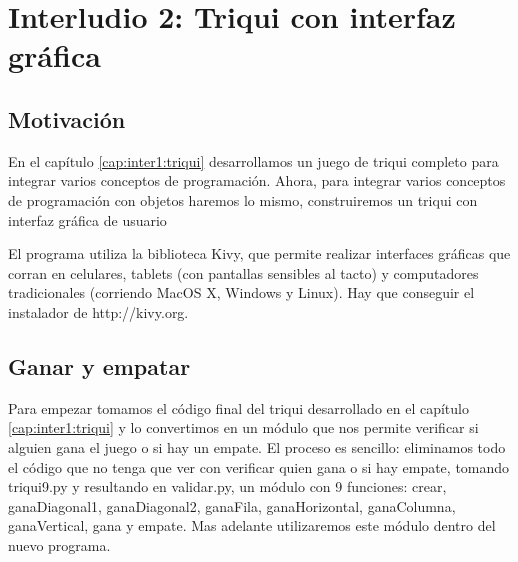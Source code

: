 


\chapter{Interludio 2: Triqui con interfaz gráfica}


\section{Motivación}
En el capítulo \ref{cap:inter1:triqui} desarrollamos un juego de triqui completo
para integrar varios conceptos de programación. Ahora, para integrar varios
conceptos de programación con objetos haremos lo mismo, construiremos un triqui
con interfaz gráfica de usuario

El programa utiliza la biblioteca Kivy, que permite realizar interfaces
gráficas que corran en celulares, tablets (con pantallas sensibles al tacto) 
y computadores tradicionales (corriendo MacOS X, Windows y Linux). Hay que 
conseguir el instalador de http://kivy.org.

\section{Ganar y empatar}
Para empezar tomamos el código final del triqui desarrollado en el capítulo \ref{cap:inter1:triqui}
y lo convertimos en un módulo que nos permite verificar si alguien gana el juego o
si hay un empate. El proceso es sencillo: eliminamos todo el código que no tenga que ver con 
verificar quien gana o si hay empate, tomando triqui9.py y resultando en validar.py, un 
módulo con 9 funciones: crear,  ganaDiagonal1,  ganaDiagonal2, ganaFila, ganaHorizontal, ganaColumna,
ganaVertical, gana y empate. Mas adelante utilizaremos este módulo dentro del nuevo programa.

